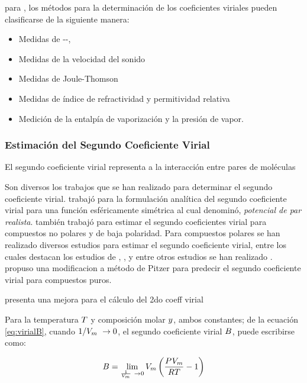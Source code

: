     para \parencite{Dymond2002}, los métodos para la determinación de los coeficientes viriales pueden clasificarse de la siguiente manera:

    \begin{itemize}
      \item Medidas de {\pressure{}{}-\Vmolar-\T{}},
      \item Medidas de la velocidad del sonido
      \item Medidas de Joule-Thomson
      \item Medidas de índice de refractividad y permitividad relativa
      \item Medición de la entalpía de vaporización y la presión de vapor. 
    \end{itemize}

\subsubsection{Estimación del Segundo Coeficiente Virial}
  
    El segundo coeficiente virial representa a la interacción entre pares de moléculas

Son diversos los trabajos que se han realizado para determinar el segundo coeficiente virial. \autocite[postnote]{woolley1969second} trabajó para la formulación analítica del segundo coeficiente virial para una función esféricamente simétrica al cual denominó, \textit{potencial de par realista}. \parencite{pitzer1990second} también trabajó para estimar el segundo coeficientes virial para compuestos no polares y de baja polaridad. Para compuestos polares se han realizado diversos estudios para estimar el segundo coeficiente virial, entre los cuales destacan los estudios de \parencite{maris1985interaction}, \parencite{tarakad1977improved}, y entre otros estudios se han realizado . \parencite{vetere2007simple} propuso una modificacion a método de Pitzer para predecir el segundo coeficiente virial para compuestos puros.

\parencite{klotz1985improved} presenta una mejora para el cálculo del 2do coeff virial



Para la temperatura $T$ y composición molar ${y_{}}$, ambos constantes; de la ecuación \eqref{eq:virialB}, cuando $1 / V_m\ \to 0$,  el segundo coeficiente virial $B_{}$, puede escribirse como:

\begin{equation}
  B_{} = \lim_{\frac{1}{V_m}\ \to {0}} V_m \left(\frac{P_{}^{}{}{} V_m} {R T} - 1 \right)
\end{equation}

